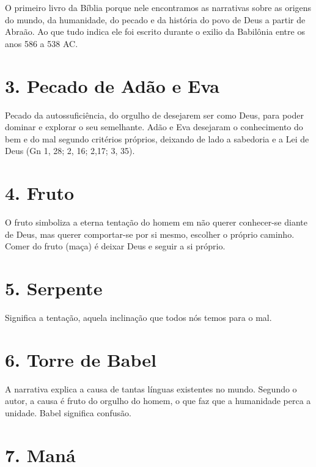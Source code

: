 \documentclass[
]{book}
\begin{document}
O primeiro livro da Bíblia porque nele encontramos as narrativas sobre as origens do mundo, da humanidade, do pecado e da história do povo de Deus a partir de Abraão. Ao que tudo indica ele foi escrito durante o exilio da Babilônia entre os anos 586 a 538 AC.

\hypertarget{pecado-de-aduxe3o-e-eva}{%
\section*{3. Pecado de Adão e Eva}\label{pecado-de-aduxe3o-e-eva}}

Pecado da autossuficiência, do orgulho de desejarem ser como Deus, para poder dominar e explorar o seu semelhante. Adão e Eva desejaram o conhecimento do bem e do mal segundo critérios próprios, deixando de lado a sabedoria e a Lei de Deus (Gn 1, 28; 2, 16; 2,17; 3, 35).

\hypertarget{fruto}{%
\section*{4. Fruto}\label{fruto}}

O fruto simboliza a eterna tentação do homem em não querer conhecer-se diante de Deus, mas querer comportar-se por si mesmo, escolher o próprio caminho. Comer do fruto (maça) é deixar Deus e seguir a si próprio.

\hypertarget{serpente}{%
\section*{5. Serpente}\label{serpente}}

Significa a tentação, aquela inclinação que todos nós temos para o mal.

\hypertarget{torre-de-babel}{%
\section*{6. Torre de Babel}\label{torre-de-babel}}

A narrativa explica a causa de tantas línguas existentes no mundo. Segundo o autor, a causa é fruto do orgulho do homem, o que faz que a humanidade perca a unidade. Babel significa confusão.

\hypertarget{manuxe1}{%
\section*{7. Maná}\label{manuxe1}}
\end{document}
